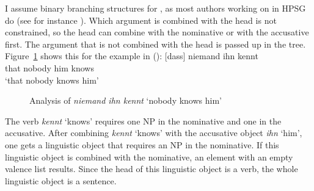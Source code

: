 \documentclass[output=paper
  ,nobabel
  ,draftmode
  ,uniformtopskip %
  ,colorlinks, citecolor=brown
]{langscibook}
\begin{document}
I assume binary branching structures for , as most authors working on  in HPSG do (see for instance
\citealt{HN94a,Kiss95a,Meurers99a,Mueller99a,Kathol2000a,Holler-Feldhaus2001a}). Which argument is
combined with the head is not constrained, so the head can combine with the nominative or with the accusative
first. The argument that is not combined with the head is passed up in the
tree. Figure~\ref{abb-niemand-ihn-kennt} shows this for the example in ():
\ea
\gll {}[dass] niemand ihn kennt\\
     \spacebr{}that nobody him knows\\
\glt `that nobody knows him'
\z
\begin{figure}
\caption{Analysis of \emph{niemand ihn kennt} `nobody knows him'}\label{abb-niemand-ihn-kennt}
\end{figure}

The verb \emph{kennt} `knows' requires one NP in the nominative and one in the accusative. After combining 
\emph{kennt} `knows' with the accusative object \emph{ihn} `him', one gets a linguistic object that requires
an NP in the nominative. If this linguistic object is combined with the nominative, an element with an
empty valence list results. Since the head of this linguistic object is a verb, the whole linguistic
object is a sentence.
\end{document}
